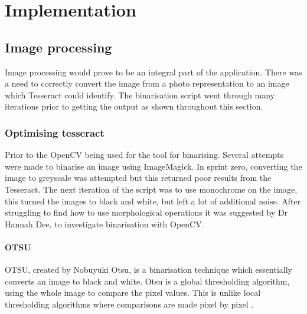 \chapter{Implementation}




\section{Image processing} \label{imp:image_proces}
Image processing would prove to be an integral part of the application. There was a need to correctly convert the image from a photo representation to an image which Tesseract could identify. The binarisation script went through many iterations prior to getting the output as shown throughout this section.
\subsection{Optimising tesseract}
Prior to the OpenCV being used for the tool for binarising. Several attempts were made to binarise an image using ImageMagick. In sprint zero, converting the image to greyscale was attempted but this returned poor results from the Tesseract. The next iteration of the script was to use monochrome on the image, this turned the images to black and white, but left a lot of additional noise. After struggling to find how to use morphological operations it was suggested by Dr Hannah Dee, to investigate binarisation with OpenCV.

\subsubsection{OTSU}
OTSU, created by Nobuyuki Otsu, is a binarisation technique which essentially converts an image to black and white. Otsu is a global thresholding algorithm, using the whole image to compare the pixel values. This is unlike local thresholding algorithms where comparisons are made pixel by pixel \cite{citeulike:6044081}.

